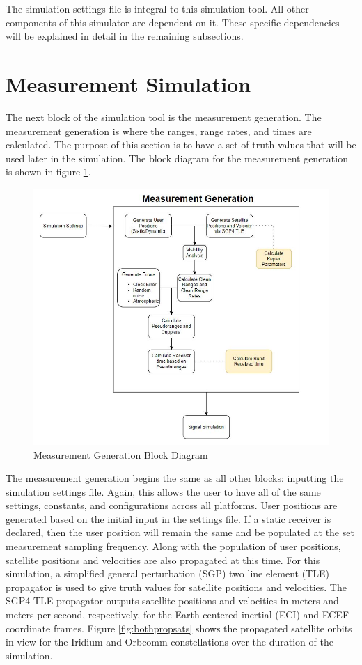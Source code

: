 \documentclass[12pt]{report}
\begin{document}
The simulation settings file is integral to this simulation tool. All other components of this simulator are dependent on it. These specific dependencies will be explained in detail in the remaining subsections.

\section{Measurement Simulation}
The next block of the simulation tool is the measurement generation. The measurement generation is where the ranges, range rates, and times are calculated. The purpose of this section is to have a set of truth values that will be used later in the simulation. The block diagram for the measurement generation is shown in figure \ref{fig:MeasBlock}.

\begin{figure}[h]
    \centering
    \includegraphics[width=5in]{MeasurementGenBlockDiagram}
    \caption{Measurement Generation Block Diagram}
    \label{fig:MeasBlock}
\end{figure}

The measurement generation begins the same as all  other blocks: inputting the simulation settings file. Again, this allows the user to have all of the same settings, constants, and configurations across all platforms. User positions are generated based on the initial input in the settings file. If a static receiver is declared, then the user position will remain the same and be populated at the set measurement sampling frequency. Along with the population of user positions, satellite positions and velocities are also propagated at this time. For this simulation, a simplified general perturbation (SGP) two line element (TLE) propagator is used to give truth values for satellite positions and velocities. The SGP4 TLE propagator outputs satellite positions and velocities in meters and meters per second, respectively, for the Earth centered inertial (ECI) and ECEF coordinate frames. Figure \ref{fig:bothpropsats} shows the propagated satellite orbits in view for the Iridium and Orbcomm constellations over the duration of the simulation. 
\end{document}
